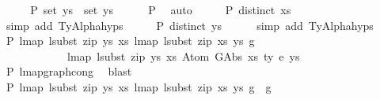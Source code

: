\begin{isabellebody}
\ \ \isamarkupfalse%
\ \isamarkupfalse%
\ P{}{\isacharcolon}{\kern0pt}\ {\isachardoublequoteopen}set\ ys\ {\isasymsubseteq}\ set\ ys{\isacharprime}{\kern0pt}{\isachardoublequoteclose}\isanewline
\ \ \ \ \isamarkupfalse%
\ P{}\ \isamarkupfalse%
\ auto\isanewline
\isanewline
\ \ \isamarkupfalse%
\ \isamarkupfalse%
\ P{}{\isacharcolon}{\kern0pt}\ {\isachardoublequoteopen}distinct\ xs{\isacharprime}{\kern0pt}{\isachardoublequoteclose}\isanewline
\ \ \ \ \isamarkupfalse%
\ {\isacharparenleft}{\kern0pt}simp\ add{\isacharcolon}{\kern0pt}\ TyAlpha{\isachardot}{\kern0pt}hyps{\isacharparenleft}{\kern0pt}{}{\isacharparenright}{\kern0pt}{\isacharparenright}{\kern0pt}\isanewline
\ \ \isamarkupfalse%
\ \isamarkupfalse%
\ P{}{\isacharcolon}{\kern0pt}\ {\isachardoublequoteopen}distinct\ ys{\isacharprime}{\kern0pt}{\isachardoublequoteclose}\isanewline
\ \ \ \ \isamarkupfalse%
\ {\isacharparenleft}{\kern0pt}simp\ add{\isacharcolon}{\kern0pt}\ TyAlpha{\isachardot}{\kern0pt}hyps{\isacharparenleft}{\kern0pt}{}{\isacharparenright}{\kern0pt}{\isacharparenright}{\kern0pt}\isanewline
\isanewline
\ \ \isamarkupfalse%
\ P{}{\isacharcolon}{\kern0pt}\ {\isachardoublequoteopen}lmap\ {\isacharparenleft}{\kern0pt}lsubst\ {\isacharparenleft}{\kern0pt}zip\ ys{\isacharprime}{\kern0pt}\ xs{\isacharprime}{\kern0pt}{\isacharparenright}{\kern0pt}{\isacharparenright}{\kern0pt}\ {\isacharparenleft}{\kern0pt}lmap\ {\isacharparenleft}{\kern0pt}lsubst\ {\isacharparenleft}{\kern0pt}zip\ xs{\isacharprime}{\kern0pt}\ ys{\isacharprime}{\kern0pt}{\isacharparenright}{\kern0pt}{\isacharparenright}{\kern0pt}\ g{\isacharparenright}{\kern0pt}\ {\isasymsimeq}\isanewline
\ \ \ \ \ \ \ \ \ \ \ \ lmap\ {\isacharparenleft}{\kern0pt}lsubst\ {\isacharparenleft}{\kern0pt}zip\ ys{\isacharprime}{\kern0pt}\ xs{\isacharprime}{\kern0pt}{\isacharparenright}{\kern0pt}{\isacharparenright}{\kern0pt}\ {\isacharparenleft}{\kern0pt}Atom\ {\isacharparenleft}{\kern0pt}GAbs\ xs\ ty{}\ e{\isacharparenright}{\kern0pt}\ ys{\isacharparenright}{\kern0pt}{\isachardoublequoteclose}\isanewline
\ \ \ \ \isamarkupfalse%
\ P{}\ lmap{\isacharunderscore}{\kern0pt}graph{\isacharunderscore}{\kern0pt}cong\ \isamarkupfalse%
\ blast\isanewline
\ \ \isamarkupfalse%
\ P{}{\isacharcolon}{\kern0pt}\ {\isachardoublequoteopen}lmap\ {\isacharparenleft}{\kern0pt}lsubst\ {\isacharparenleft}{\kern0pt}zip\ ys{\isacharprime}{\kern0pt}\ xs{\isacharprime}{\kern0pt}{\isacharparenright}{\kern0pt}{\isacharparenright}{\kern0pt}\ {\isacharparenleft}{\kern0pt}lmap\ {\isacharparenleft}{\kern0pt}lsubst\ {\isacharparenleft}{\kern0pt}zip\ xs{\isacharprime}{\kern0pt}\ ys{\isacharprime}{\kern0pt}{\isacharparenright}{\kern0pt}{\isacharparenright}{\kern0pt}\ g{\isacharparenright}{\kern0pt}\ {\isacharequal}{\kern0pt}\ g{\isachardoublequoteclose}\isanewline

\end{isabellebody}
